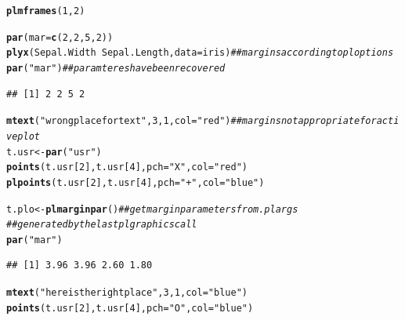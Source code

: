 \documentclass[11pt]{article}\usepackage[]{graphicx}\usepackage[]{color}
\makeatletter
\newcommand{\hlnum}[1]{\textcolor[rgb]{0.686,0.059,0.569}{#1}}%
\newcommand{\hlstr}[1]{\textcolor[rgb]{0.192,0.494,0.8}{#1}}%
\newcommand{\hlcom}[1]{\textcolor[rgb]{0.678,0.584,0.686}{\textit{#1}}}%
\newcommand{\hlopt}[1]{\textcolor[rgb]{0,0,0}{#1}}%
\newcommand{\hlstd}[1]{\textcolor[rgb]{0.345,0.345,0.345}{#1}}%
\newcommand{\hlkwb}[1]{\textcolor[rgb]{0.69,0.353,0.396}{#1}}%
\newcommand{\hlkwc}[1]{\textcolor[rgb]{0.333,0.667,0.333}{#1}}%
\newcommand{\hlkwd}[1]{\textcolor[rgb]{0.737,0.353,0.396}{\textbf{#1}}}%
\newenvironment{kframe}{%
 \def\at@end@of@kframe{}%
 \ifinner\ifhmode%
  \def\at@end@of@kframe{\end{minipage}}%
  \begin{minipage}{\columnwidth}%
 \fi\fi%
 \def\FrameCommand##1{\hskip\@totalleftmargin \hskip-\fboxsep
 \colorbox{shadecolor}{##1}\hskip-\fboxsep
     \hskip-\linewidth \hskip-\@totalleftmargin \hskip\columnwidth}%
 \MakeFramed {\advance\hsize-\width
   \@totalleftmargin\z@ \linewidth\hsize
   \@setminipage}}%
 {\par\unskip\endMakeFramed%
 \at@end@of@kframe}
\newenvironment{knitrout}{}{} %
\makeatother
\begin{document}
\begin{knitrout}
\color{fgcolor}\begin{kframe}
\begin{alltt}
\hlkwd{plmframes}\hlstd{(}\hlnum{1}\hlstd{,}\hlnum{2}\hlstd{)}

\hlkwd{par}\hlstd{(}\hlkwc{mar}\hlstd{=}\hlkwd{c}\hlstd{(}\hlnum{2}\hlstd{,}\hlnum{2}\hlstd{,}\hlnum{5}\hlstd{,}\hlnum{2}\hlstd{))}
\hlkwd{plyx}\hlstd{(Sepal.Width}\hlopt{~}\hlstd{Sepal.Length,} \hlkwc{data}\hlstd{=iris)} \hlcom{## margins according to ploptions}
\hlkwd{par}\hlstd{(}\hlstr{"mar"}\hlstd{)} \hlcom{## paramteres have been recovered}
\end{alltt}
\begin{verbatim}
## [1] 2 2 5 2
\end{verbatim}
\begin{alltt}
\hlkwd{mtext}\hlstd{(}\hlstr{"wrong place for text"}\hlstd{,}\hlnum{3}\hlstd{,}\hlnum{1}\hlstd{,} \hlkwc{col}\hlstd{=}\hlstr{"red"}\hlstd{)}  \hlcom{## margins not appropriate for active plot}
\hlstd{t.usr} \hlkwb{<-} \hlkwd{par}\hlstd{(}\hlstr{"usr"}\hlstd{)}
\hlkwd{points}\hlstd{(t.usr[}\hlnum{2}\hlstd{],t.usr[}\hlnum{4}\hlstd{],} \hlkwc{pch}\hlstd{=}\hlstr{"X"}\hlstd{,} \hlkwc{col}\hlstd{=}\hlstr{"red"}\hlstd{)}
\hlkwd{plpoints}\hlstd{(t.usr[}\hlnum{2}\hlstd{],t.usr[}\hlnum{4}\hlstd{],} \hlkwc{pch}\hlstd{=}\hlstr{"+"}\hlstd{,} \hlkwc{col}\hlstd{=}\hlstr{"blue"}\hlstd{)}

\hlstd{t.plo} \hlkwb{<-} \hlkwd{plmarginpar}\hlstd{()} \hlcom{## get margin parameters from .plargs }
  \hlcom{## generated by the last pl graphics call}
\hlkwd{par}\hlstd{(}\hlstr{"mar"}\hlstd{)}
\end{alltt}
\begin{verbatim}
## [1] 3.96 3.96 2.60 1.80
\end{verbatim}
\begin{alltt}
\hlkwd{mtext}\hlstd{(}\hlstr{"here is the right place"}\hlstd{,}\hlnum{3}\hlstd{,}\hlnum{1}\hlstd{,} \hlkwc{col}\hlstd{=}\hlstr{"blue"}\hlstd{)}
\hlkwd{points}\hlstd{(t.usr[}\hlnum{2}\hlstd{],t.usr[}\hlnum{4}\hlstd{],} \hlkwc{pch}\hlstd{=}\hlstr{"O"}\hlstd{,} \hlkwc{col}\hlstd{=}\hlstr{"blue"}\hlstd{)}


\end{alltt}
\end{kframe}
\end{knitrout}
\end{document}
